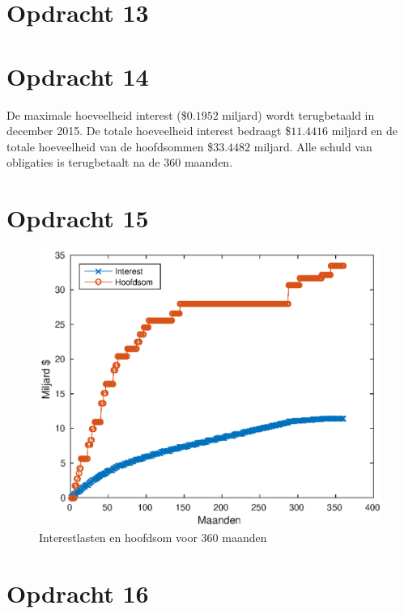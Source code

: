 \documentclass[11pt,a4paper]{article}
\begin{document}
\section*{Opdracht 13}



\section*{Opdracht 14}
De maximale hoeveelheid interest (\$$0.1952$ miljard) wordt terugbetaald in december 2015. De totale hoeveelheid interest bedraagt \$$11.4416$ miljard en de totale hoeveelheid van de hoofdsommen \$$33.4482$ miljard. 
Alle schuld van obligaties is terugbetaalt na de 360 maanden.


\section*{Opdracht 15}
\begin{figure}[H]
\centering
\includegraphics[scale=0.75]{opdracht15}
\caption{Interestlasten en hoofdsom voor 360 maanden}
\end{figure}


\section*{Opdracht 16}
\end{document}
